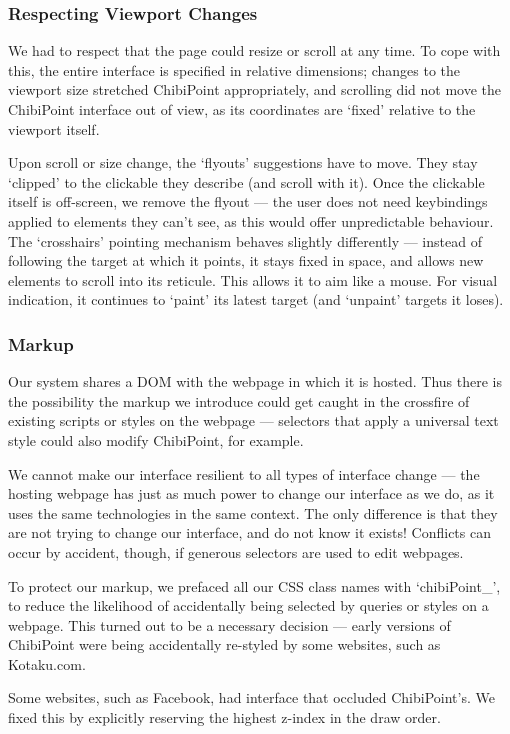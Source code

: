 \documentclass[a4paper, 12pt]{report}
\begin{document}
\subsubsection{Respecting Viewport Changes}
We had to respect that the page could resize or scroll at any time. To cope with this, the entire interface is specified in relative dimensions; changes to the viewport size stretched ChibiPoint appropriately, and scrolling did not move the ChibiPoint interface out of view, as its coordinates are `fixed' relative to the viewport itself.

Upon scroll or size change, the `flyouts' suggestions have to move. They stay `clipped' to the clickable they describe (and scroll with it). Once the clickable itself is off-screen, we remove the flyout --- the user does not need keybindings applied to elements they can't see, as this would offer unpredictable behaviour. The `crosshairs' pointing mechanism behaves slightly differently --- instead of following the target at which it points, it stays fixed in space, and allows new elements to scroll into its reticule. This allows it to aim like a mouse. For visual indication, it continues to `paint' its latest target (and `unpaint' targets it loses).

\subsubsection{Markup}
Our system shares a DOM with the webpage in which it is hosted. Thus there is the possibility the markup we introduce could get caught in the crossfire of existing scripts or styles on the webpage --- selectors that apply a universal text style could also modify ChibiPoint, for example.

We cannot make our interface resilient to all types of interface change --- the hosting webpage has just as much power to change our interface as we do, as it uses the same technologies in the same context. The only difference is that they are not trying to change our interface, and do not know it exists! Conflicts can occur by accident, though, if generous selectors are used to edit webpages.

To protect our markup, we prefaced all our CSS class names with `chibiPoint\_', to reduce the likelihood of accidentally being selected by queries or styles on a webpage. This turned out to be a necessary decision --- early versions of ChibiPoint were being accidentally re-styled by some websites, such as Kotaku.com.

Some websites, such as Facebook, had interface that occluded ChibiPoint's. We fixed this by explicitly reserving the highest z-index in the draw order.
\end{document}
